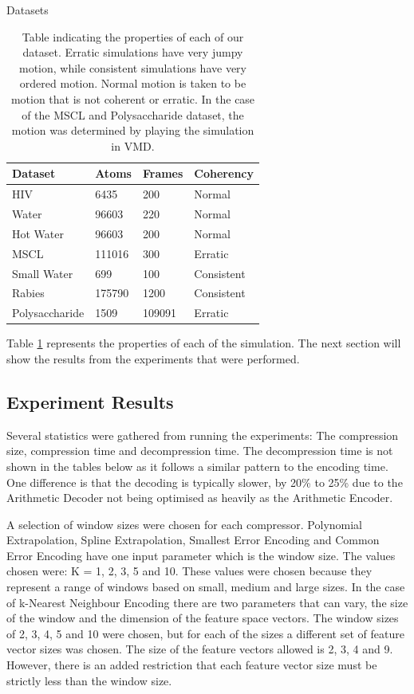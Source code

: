 \documentclass[a4paper,11pt]{report}
\begin{document}
\begin{section}{Datasets}
\begin{table}[!h]
\begin{center}
        \begin{tabular}{ | l | l | l | l |}
                \hline
                Dataset & Atoms & Frames & Coherency \\ \hline
                HIV & 6435 & 200 & Normal \\ \hline
		Water & 96603 & 220 & Normal \\ \hline
		Hot Water & 96603 & 200 & Normal \\ \hline
		MSCL & 111016 & 300 & Erratic \\ \hline
		Small Water & 699 & 100 & Consistent \\ \hline
		Rabies & 175790 & 1200 & Consistent \\ \hline
		Polysaccharide & 1509 & 109091 & Erratic \\ \hline
        \end{tabular}
\end{center}
\label{tableplane}
\caption{Table indicating the properties of each of our dataset. Erratic simulations have very jumpy motion, while consistent simulations have very ordered motion. Normal motion is taken to be motion that is not coherent or erratic. In the case of the MSCL and Polysaccharide dataset, the motion was determined by playing the simulation in VMD.}
\end{table}

Table \ref{tableplane} represents the properties of each of the simulation. The next section will show the results from the experiments that were performed.

\section{Experiment Results}

Several statistics were gathered from running the experiments: The compression size, compression time and decompression time. The decompression time is not shown in the tables below as it follows a similar pattern to the encoding time. One difference is that the decoding is typically slower, by 20\% to 25\% due to the Arithmetic Decoder not being optimised as heavily as the Arithmetic Encoder. 

A selection of window sizes were chosen for each compressor. Polynomial Extrapolation, Spline Extrapolation, Smallest Error Encoding and Common Error Encoding have one input parameter which is the window size. The values chosen were: K = 1, 2, 3, 5 and 10. These values were chosen because they represent a range of windows based on small, medium and large sizes. In the case of k-Nearest Neighbour Encoding there are two parameters that can vary, the size of the window and the dimension of the feature space vectors. The window sizes of 2, 3, 4, 5 and 10 were chosen, but for each of the sizes a different set of feature vector sizes was chosen. The size of the feature vectors allowed is 2, 3, 4 and 9. However, there is an added restriction that each feature vector size must be strictly less than the window size.


\end{section}
\end{document}

